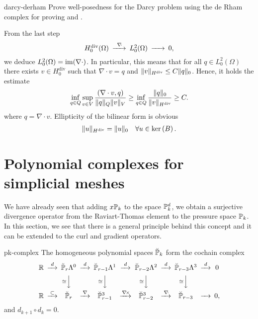 \begin{Problem}{darcy-derham}
  Prove well-posedness for the Darcy problem using the de Rham complex
  for proving  and
  .
\begin{solution}
From the last step
 \begin{gather}\minCDarrowwidth20pt
    \begin{CD}
      \Hdiv_0(\domain)
      @>{\div}>> L^2_0(\domain)
      @>>> 0,
    \end{CD}
  \end{gather}
we deduce $L_0^2(\Omega)=\range{\nabla\cdot}$. In particular, this means
that for all $q\in L_0^2(\Omega)$ there exists $v\in H_0^{\text{div}}$ such that
$\nabla \cdot v=q$ and $\norm{v}_{H^{\text{div}}}\leq C \norm{q}_0$.
Hence, it holds the estimate
\begin{align*}
\inf_{q\in Q}\sup_{v\in V}\frac{(\nabla \cdot v, q)}{\norm{q}_Q\norm{v}_V}
  \geq \inf_{q\in Q} \frac{\norm{q}_0}{\norm{v}_{H^{\text{div}}}}\geq C.
\end{align*}
where $q = \nabla \cdot v$. Ellipticity of the bilinear form is obvious
\begin{align*}
  \norm{u}_{H^{\text{div}}}=\norm{u}_0 \quad \forall u\in \ker B.
\end{align*}
\end{solution}
\end{Problem}

\section{Polynomial complexes for simplicial meshes}

\begin{intro}
  We have already seen that adding $x\P_k$ to the space $\P_k^d$, we
  obtain a surjective divergence operator from the Raviart-Thomas
  element to the pressure space $\P_k$. In this section, we see that
  there is a general principle behind this concept and it can be
  extended to the curl and gradient operators.
\end{intro}

\begin{Notation}{pk-complex}
  The homogeneous polynomial spaces $\breve\P_k$ form the cochain complex
  \begin{gather}\minCDarrowwidth15pt
    \begin{CD}
      \R
      @>{d}>> \breve\P_r\Lambda^0
      @>{d}>> \breve\P_{r-1}\Lambda^1
      @>{d}>> \breve\P_{r-2}\Lambda^2
      @>{d}>> \breve\P_{r-3}\Lambda^3
      @>{d}>> 0
      \\
      @.
      @V{\cong}VV
      @V{\cong}VV
      @V{\cong}VV
      @V{\cong}VV
      \\
      \R
      @>{\subset}>> \breve\P_r
      @>{\nabla}>> \breve\P_{r-1}^3
      @>{\curl}>> \breve\P_{r-2}^3
      @>{\div}>> \breve\P_{r-3}
      @>>> 0,
    \end{CD}
  \end{gather}
  and $d_{k+1}\circ d_k = 0$.
\end{Notation}

